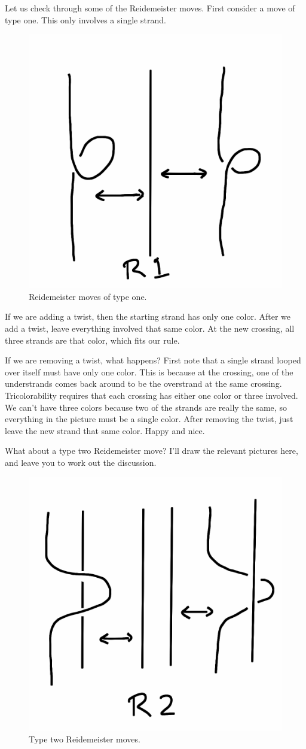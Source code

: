 \documentclass[12pt,letterpaper]{article}
\theoremstyle{definition}
\begin{document}
Let us check through some of the Reidemeister moves.
First consider a move of type one.
This only involves a single strand.

\begin{figure}[h]
    \centering
    \includegraphics[width=.3\textwidth]{rgp08pics/r1.png}
    \caption{Reidemeister moves of type one.}
\end{figure}

If we are adding a twist, then the starting strand has only one color.
After we add a twist, leave everything involved that same color.
At the new crossing, all three strands are that color, which fits our rule.



If we are removing a twist, what happens?
First note that a single strand looped over itself must have only one color. This is because at the crossing, one of the understrands comes back around to be the overstrand at the same crossing.
Tricolorability requires that each crossing has either one color or three involved.
We can't have three colors because two of the strands are really the same, so everything in the picture must be a single color.
After removing the twist, just leave the new strand that same color.
Happy and nice.


What about a type two Reidemeister move?
I'll draw the relevant pictures here, and leave you to work out the discussion.

\begin{figure}[h]
    \centering
    \includegraphics[width=.4\textwidth]{rgp08pics/r2.png}
    \caption{Type two Reidemeister moves.}
\end{figure}
\end{document}
